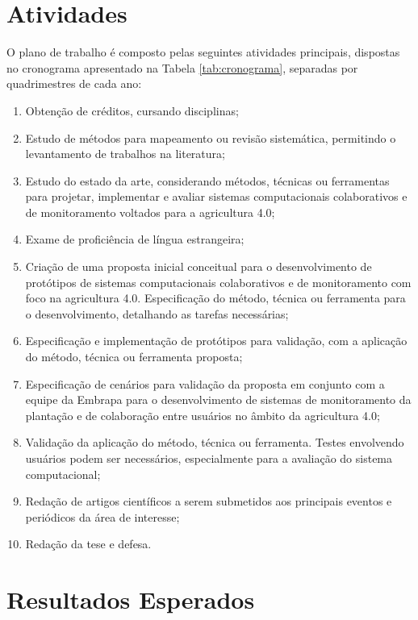 \documentclass[12pt]{article}
\begin{document}
\section{Atividades}
\label{sec:atividades}

O plano de trabalho é composto pelas seguintes atividades principais, dispostas no cronograma apresentado na Tabela \ref{tab:cronograma}, separadas por quadrimestres de cada ano:

\begin{enumerate}
	\item Obtenção de créditos, cursando disciplinas;
	\item Estudo de métodos para mapeamento ou revisão sistemática, permitindo o levantamento de trabalhos na literatura;
	\item Estudo do estado da arte, considerando métodos, técnicas ou ferramentas para projetar, implementar e avaliar sistemas computacionais colaborativos e de monitoramento voltados para a agricultura 4.0;
	\item Exame de proficiência de língua estrangeira;
	\item Criação de uma proposta inicial conceitual para o desenvolvimento de protótipos de sistemas computacionais colaborativos e de monitoramento com foco na agricultura 4.0. Especificação do método, técnica ou ferramenta para o desenvolvimento, detalhando as tarefas necessárias;
	\item Especificação e implementação de protótipos para validação, com a aplicação do método, técnica ou ferramenta proposta;
	\item Especificação de cenários para validação da proposta em conjunto com a equipe da Embrapa para o desenvolvimento de sistemas de monitoramento da plantação e de colaboração entre usuários no âmbito da agricultura 4.0;
	\item Validação da aplicação do método, técnica ou ferramenta. Testes envolvendo usuários podem ser necessários, especialmente para a avaliação do sistema computacional;
	\item Redação de artigos científicos a serem submetidos aos principais eventos e periódicos da área de interesse;
	\item Redação da tese e defesa.
\end{enumerate}

\section{Resultados Esperados}
\label{sec:resultados_esperados}
\end{document}
